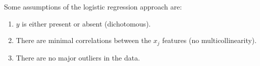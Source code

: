 Some assumptions of the logistic regression approach are:
\begin{enumerate}[noitemsep]
\item $y$ is either present or absent (dichotomous).
\item There are minimal correlations between the $x_{j}$ features (no multicollinearity).
\item There are no major outliers in the data.
\end{enumerate}


